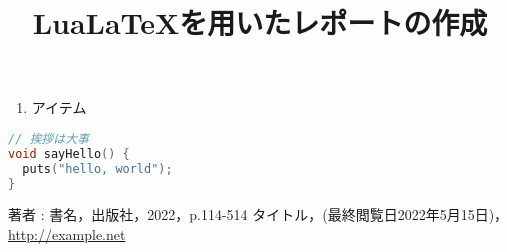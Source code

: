 \documentclass[a4paper]{ltjsarticle}
\title{LuaLaTeXを用いたレポートの作成}
\newcommand{\maru}[1]{\raisebox{.5pt}{\textcircled{\raisebox{-.9pt}{#1}}}}
\begin{document}
\maketitle

\begin{enumerate}[label=\maru{\arabic*}]
  \item アイテム
\end{enumerate}

\begin{lstlisting}[language=C++, caption=ほげ, label=lst:hoge]
// 挨拶は大事
void sayHello() {
  puts("hello, world");
}
\end{lstlisting}

\begin{thebibliography}{99}
   著者 : 書名，出版社，2022，p.114-514
   タイトル，(最終閲覧日2022年5月15日)，\url{http://example.net}
\end{thebibliography}
\end{document}
